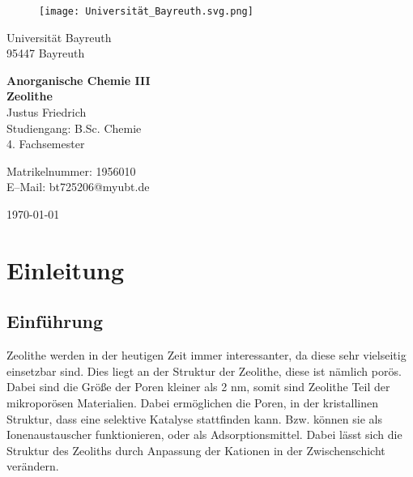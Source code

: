 \documentclass[12pt, a4paper]{article}
\begin{document}
\begin{figure}
    \texttt{[image: Universität\_Bayreuth.svg.png]}
\end{figure}



{\raggedright Universität Bayreuth\\  95447 Bayreuth}


\vspace{5cm}

\begin{center}
{\LARGE\bf{Anorganische Chemie III}} \\  
\vspace{1cm}
{\Large\bf{Zeolithe}}\\
\vspace{0.5cm}
{\large Justus Friedrich\\}
{Studiengang: B.Sc. Chemie\\}
{4. Fachsemester}
\end{center}





\thispagestyle{empty}
\begin{center}
{\small Matrikelnummer: 1956010 \\
E–Mail:  bt725206@myubt.de}
\end{center}

\vspace{5cm}

\begin{center}
  \today
\end{center}


\newpage
\tableofcontents
\thispagestyle{empty}


\newpage
\setcounter{page}{1}
\section{Einleitung}



\subsection{Einführung}
{
Zeolithe werden in der heutigen Zeit immer interessanter, da diese sehr vielseitig einsetzbar sind. 
Dies liegt an der Struktur der Zeolithe, diese ist nämlich porös. Dabei sind die Größe der Poren kleiner als 
2 nm, somit sind Zeolithe Teil der mikroporösen Materialien. Dabei ermöglichen die Poren, in der kristallinen
Struktur, dass eine selektive Katalyse stattfinden kann. Bzw. können sie als Ionenaustauscher
funktionieren, oder als Adsorptionsmittel. Dabei lässt sich die Struktur des Zeoliths durch Anpassung der Kationen 
in der Zwischenschicht verändern.\cite{riedel}
}
\end{document}
